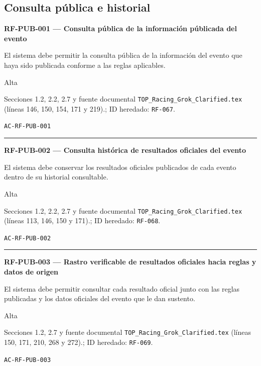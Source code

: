 \documentclass[10pt,letterpaper]{article}
\begin{document}
\subsection{Consulta pública e historial}
\noindent\textbf{RF-PUB-001 --- Consulta pública de la información públicada del evento}\par
\begin{description}[style=nextline,leftmargin=3.15cm,labelwidth=2.8cm,font=\normalfont\bfseries]
\item[Obligación] El sistema debe permitir la consulta pública de la información del evento que haya sido publicada conforme a las reglas aplicables.
\item[Prioridad] Alta
\item[Procedencia] Secciones 1.2, 2.2, 2.7 y fuente documental \texttt{TOP\_Racing\_Grok\_Clarified.tex} (líneas 146, 150, 154, 171 y 219).; ID heredado: \texttt{RF-067}.
\item[Verificación] \texttt{AC-RF-PUB-001}
\end{description}
\vspace{0.25em}\hrule\vspace{0.65em}
\noindent\textbf{RF-PUB-002 --- Consulta histórica de resultados oficiales del evento}\par
\begin{description}[style=nextline,leftmargin=3.15cm,labelwidth=2.8cm,font=\normalfont\bfseries]
\item[Obligación] El sistema debe conservar los resultados oficiales publicados de cada evento dentro de su historial consultable.
\item[Prioridad] Alta
\item[Procedencia] Secciones 1.2, 2.2, 2.7 y fuente documental \texttt{TOP\_Racing\_Grok\_Clarified.tex} (líneas 113, 146, 150 y 171).; ID heredado: \texttt{RF-068}.
\item[Verificación] \texttt{AC-RF-PUB-002}
\end{description}
\vspace{0.25em}\hrule\vspace{0.65em}
\noindent\textbf{RF-PUB-003 --- Rastro verificable de resultados oficiales hacia reglas y datos de origen}\par
\begin{description}[style=nextline,leftmargin=3.15cm,labelwidth=2.8cm,font=\normalfont\bfseries]
\item[Obligación] El sistema debe permitir consultar cada resultado oficial junto con las reglas publicadas y los datos oficiales del evento que le dan sustento.
\item[Prioridad] Alta
\item[Procedencia] Secciones 1.2, 2.7 y fuente documental \texttt{TOP\_Racing\_Grok\_Clarified.tex} (líneas 150, 171, 210, 268 y 272).; ID heredado: \texttt{RF-069}.
\item[Verificación] \texttt{AC-RF-PUB-003}
\end{description}
\end{document}
